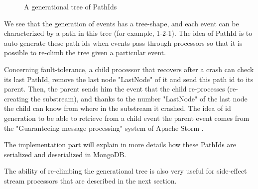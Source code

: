 \begin{figure}[h]
  \begin{center} 
    \caption{A generational tree of PathIds}
    \label{fig:treepathid}
  \end{center}
\end{figure}

We see that the generation of events has a tree-shape, and each event can be characterized by a path in this tree (for example, 1-2-1). The idea of PathId is to
auto-generate these path ids when events pass through processors so that it is possible to re-climb the tree given a particular event.

Concerning fault-tolerance, a child processor that recovers after a crash can check its last PathId, remove the last node "LastNode" of it and send this path id to its parent. Then, the parent sends him the event that the child re-processes (re-creating the substream), and thanks to the number "LastNode" of the last node the child can know from where in the substream it crashed. The idea of id generation to be able to retrieve from a child event the parent event comes from the "Guaranteeing message processing" system of Apache Storm .

The implementation part will explain in more details how these PathIds are serialized and deserialized in MongoDB.

The ability of re-climbing the generational tree is also very useful for side-effect stream processors that are described in the next section.

